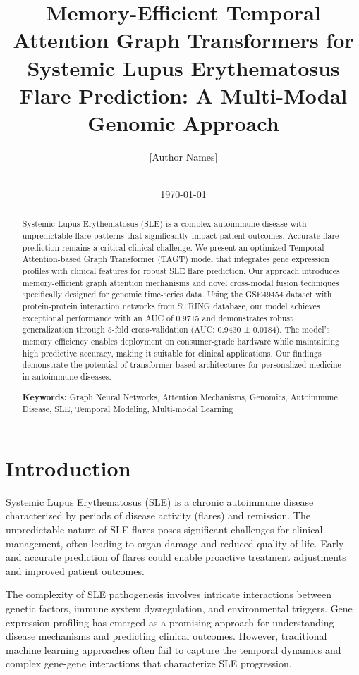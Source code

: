 \documentclass[10pt,twocolumn]{article}
\title{Memory-Efficient Temporal Attention Graph Transformers for Systemic Lupus Erythematosus Flare Prediction: A Multi-Modal Genomic Approach}
\author{
[Author Names]\\
[University/Institution]\\
[Email addresses]
}
\date{\today}
\begin{document}
\maketitle

\begin{abstract}
Systemic Lupus Erythematosus (SLE) is a complex autoimmune disease with unpredictable flare patterns that significantly impact patient outcomes. Accurate flare prediction remains a critical clinical challenge. We present an optimized Temporal Attention-based Graph Transformer (TAGT) model that integrates gene expression profiles with clinical features for robust SLE flare prediction. Our approach introduces memory-efficient graph attention mechanisms and novel cross-modal fusion techniques specifically designed for genomic time-series data. Using the GSE49454 dataset with protein-protein interaction networks from STRING database, our model achieves exceptional performance with an AUC of 0.9715 and demonstrates robust generalization through 5-fold cross-validation (AUC: 0.9430 ± 0.0184). The model's memory efficiency enables deployment on consumer-grade hardware while maintaining high predictive accuracy, making it suitable for clinical applications. Our findings demonstrate the potential of transformer-based architectures for personalized medicine in autoimmune diseases.

\textbf{Keywords:} Graph Neural Networks, Attention Mechanisms, Genomics, Autoimmune Disease, SLE, Temporal Modeling, Multi-modal Learning
\end{abstract}

\section{Introduction}

Systemic Lupus Erythematosus (SLE) is a chronic autoimmune disease characterized by periods of disease activity (flares) and remission. The unpredictable nature of SLE flares poses significant challenges for clinical management, often leading to organ damage and reduced quality of life. Early and accurate prediction of flares could enable proactive treatment adjustments and improved patient outcomes.

The complexity of SLE pathogenesis involves intricate interactions between genetic factors, immune system dysregulation, and environmental triggers. Gene expression profiling has emerged as a promising approach for understanding disease mechanisms and predicting clinical outcomes. However, traditional machine learning approaches often fail to capture the temporal dynamics and complex gene-gene interactions that characterize SLE progression.
\end{document}
